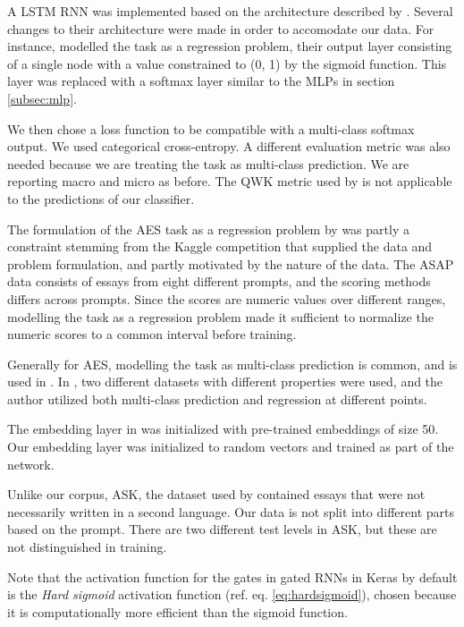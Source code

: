 A \ac{LSTM} \ac{RNN} was implemented based on the architecture described by
\textcite{taghipour16}. Several changes to their architecture were made in
order to accomodate our data. For instance, \citeauthor{taghipour16} modelled
the task as a regression problem, their output layer consisting of a single
node with a value constrained to (0, 1) by the sigmoid function. This layer
was replaced with a softmax layer similar to the \acp{MLP} in section
\ref{subsec:mlp}.

We then chose a loss function to be compatible with a multi-class softmax
output. We used categorical cross-entropy. A different evaluation metric was
also needed because we are treating the task as multi-class prediction. We
are reporting macro and micro \FI as before. The \ac{QWK} metric used by
\citeauthor{taghipour16} is not applicable to the predictions of our
classifier.

The formulation of the \ac{AES} task as a regression problem by \citeauthor{taghipour16}
was partly a constraint stemming from the Kaggle competition that supplied
the data and problem formulation, and partly motivated by the nature of the
data. The ASAP data consists of essays from eight different prompts, and the
scoring methods differs across prompts. Since the scores are numeric values over
different ranges, modelling the task as a regression problem made it sufficient
to normalize the numeric scores to a common interval before training.

Generally for \ac{AES}, modelling the task as multi-class prediction is common,
and is used in \autocite{vajjala18universalCEFR}. In \autocite{vajjala17}, two
different datasets with different properties were used, and the author utilized
both multi-class prediction and regression at different points.

The embedding layer in \textcite{taghipour16} was initialized with
pre-trained embeddings of size 50. Our embedding layer was initialized to
random vectors and trained as part of the network.

Unlike our corpus, ASK, the dataset used by \citeauthor{taghipour16}
contained essays that were not necessarily written in a second language. Our
data is not split into different parts based on the prompt. There are two
different test levels in ASK, but these are not distinguished in training.

Note that the activation function for the gates in gated RNNs in Keras by
default is the \emph{Hard sigmoid} activation function (ref. eq.
\ref{eq:hardsigmoid}), chosen because it is computationally more efficient
than the sigmoid function.

